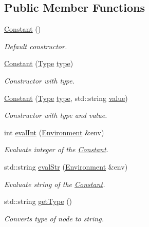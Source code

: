 \subsection*{Public Member Functions}
\begin{DoxyCompactItemize}
\item 
\hypertarget{classConstant_a6d2f7d070d22aed4a3371c181da67716}{}\hyperlink{classConstant_a6d2f7d070d22aed4a3371c181da67716}{Constant} ()\label{classConstant_a6d2f7d070d22aed4a3371c181da67716}

\begin{DoxyCompactList}\small\item\em Default constructor. \end{DoxyCompactList}\item 
\hyperlink{classConstant_a952469735b0f54c34b9db659ae2c6bf1}{Constant} (\hyperlink{classConstant_aae1f2765a3f050013d5ab334de3b5985}{Type} \hyperlink{classConstant_ae680fe722ea06116b5b186c137daf883}{type})
\begin{DoxyCompactList}\small\item\em Constructor with type. \end{DoxyCompactList}\item 
\hyperlink{classConstant_ad5838e4497d0dc5384a6a60387003039}{Constant} (\hyperlink{classConstant_aae1f2765a3f050013d5ab334de3b5985}{Type} \hyperlink{classConstant_ae680fe722ea06116b5b186c137daf883}{type}, std\+::string \hyperlink{classNode_a51de8a12e67206f893b0bd6c2afeb11c}{value})
\begin{DoxyCompactList}\small\item\em Constructor with type and value. \end{DoxyCompactList}\item 
int \hyperlink{classConstant_a36753a0a5cf6b7f480a7548d154896cc}{eval\+Int} (\hyperlink{classEnvironment}{Environment} \&env)
\begin{DoxyCompactList}\small\item\em Evaluate integer of the \hyperlink{classConstant}{Constant}. \end{DoxyCompactList}\item 
std\+::string \hyperlink{classConstant_a474f09f1717851de4436975f394d89b4}{eval\+Str} (\hyperlink{classEnvironment}{Environment} \&env)
\begin{DoxyCompactList}\small\item\em Evaluate string of the \hyperlink{classConstant}{Constant}. \end{DoxyCompactList}\item 
std\+::string \hyperlink{classConstant_ac2ad057c7cd5995e9e0331c3725db204}{get\+Type} ()
\begin{DoxyCompactList}\small\item\em Converts type of node to string. \end{DoxyCompactList}\end{DoxyCompactItemize}
